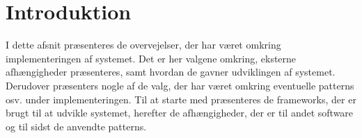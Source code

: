 \documentclass[Implementering/Implementering_main.tex]{subfiles}
\begin{document}
\section{Introduktion}
I dette afsnit præsenteres de overvejelser, der har været omkring implementeringen af systemet. Det er her valgene omkring, eksterne afhængigheder præsenteres, samt hvordan de gavner udviklingen af systemet. Derudover præsenters nogle af de valg, der har været omkring eventuelle patterns osv. under implementeringen. Til at starte med præsenteres de frameworks, der er brugt til at udvikle systemet, herefter de afhængigheder, der er til andet software og til sidst de anvendte patterns. 
\end{document}

